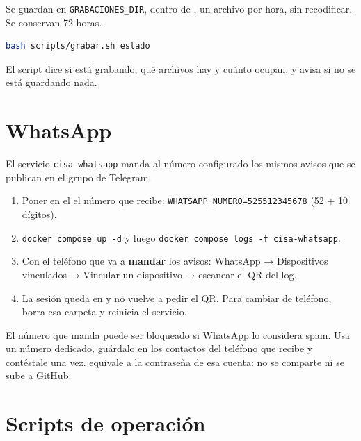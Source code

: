 Se guardan en \texttt{GRABACIONES\_DIR}, dentro de , un
archivo por hora, sin recodificar. Se conservan 72 horas.

\begin{lstlisting}[language=bash, caption={Estado de la grabación},
                   label={lst:grabar}]
bash scripts/grabar.sh estado
\end{lstlisting}

El script dice si está grabando, qué archivos hay y cuánto ocupan, y avisa si no
se está guardando nada.

\section{WhatsApp}

El servicio \texttt{cisa-whatsapp} manda al número configurado los mismos avisos
que se publican en el grupo de Telegram.

\begin{enumerate}
  \item Poner en el  el número que recibe:
        \texttt{WHATSAPP\_NUMERO=525512345678} (52 + 10 dígitos).
  \item \texttt{docker compose up -d} y luego
        \texttt{docker compose logs -f cisa-whatsapp}.
  \item Con el teléfono que va a \textbf{mandar} los avisos: WhatsApp →
        Dispositivos vinculados → Vincular un dispositivo → escanear el QR del
        log.
  \item La sesión queda en  y no vuelve a pedir el QR.
        Para cambiar de teléfono, borra esa carpeta y reinicia el servicio.
\end{enumerate}

\begin{peligro}[title={No es la API oficial}]
El número que manda puede ser bloqueado si WhatsApp lo considera spam. Usa un
número dedicado, guárdalo en los contactos del teléfono que recibe y contéstale
una vez.  equivale a la contraseña de esa cuenta: no se
comparte ni se sube a GitHub.
\end{peligro}

\section{Scripts de operación}

